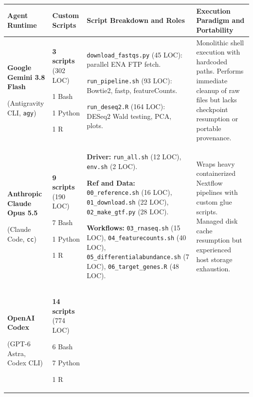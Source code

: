 \documentclass[11pt,letterpaper]{article}
\begin{document}
\begin{table}[!htbp]
\centering
\scriptsize
\renewcommand{\arraystretch}{0.92}
\begin{tabularx}{\textwidth}{p{2.8cm}p{2.2cm}XX}
\toprule
\textbf{Agent Runtime} & \textbf{Custom Scripts} & \textbf{Script Breakdown and Roles} & \textbf{Execution Paradigm and Portability} \\
\midrule
\textbf{Google Gemini 3.8 Flash} \par (Antigravity CLI, \texttt{agy}) & \textbf{3 scripts} (302 LOC) \par\vspace{0.2em} 1 Bash \par 1 Python \par 1 R &
\texttt{download\_fastqs.py} (45 LOC): parallel ENA FTP fetch. \par
\texttt{run\_pipeline.sh} (93 LOC): Bowtie2, fastp, featureCounts. \par
\texttt{run\_deseq2.R} (164 LOC): DESeq2 Wald testing, PCA, plots. &
Monolithic shell execution with hardcoded paths. Performs immediate cleanup of raw files but lacks checkpoint resumption or portable provenance. \\
\addlinespace
\textbf{Anthropic Claude Opus 5.5} \par (Claude Code, \texttt{cc}) & \textbf{9 scripts} (190 LOC) \par\vspace{0.2em} 7 Bash \par 1 Python \par 1 R &
\textbf{Driver:} \texttt{run\_all.sh} (12 LOC), \texttt{env.sh} (2 LOC). \par
\textbf{Ref and Data:} \texttt{00\_reference.sh} (16 LOC), \texttt{01\_download.sh} (22 LOC), \texttt{02\_make\_gtf.py} (28 LOC). \par
\textbf{Workflows:} \texttt{03\_rnaseq.sh} (15 LOC), \texttt{04\_featurecounts.sh} (40 LOC), \texttt{05\_differentialabundance.sh} (7 LOC), \texttt{06\_target\_genes.R} (48 LOC). &
Wraps heavy containerized Nextflow pipelines with custom glue scripts. Managed disk cache resumption but experienced host storage exhaustion. \\
\addlinespace
\textbf{OpenAI Codex} \par (GPT-6 Astra, Codex CLI) & \textbf{14 scripts} (774 LOC) \par\vspace{0.2em} 6 Bash \par 7 Python \par 1 R &

\end{tabularx}
\end{table}
\end{document}
